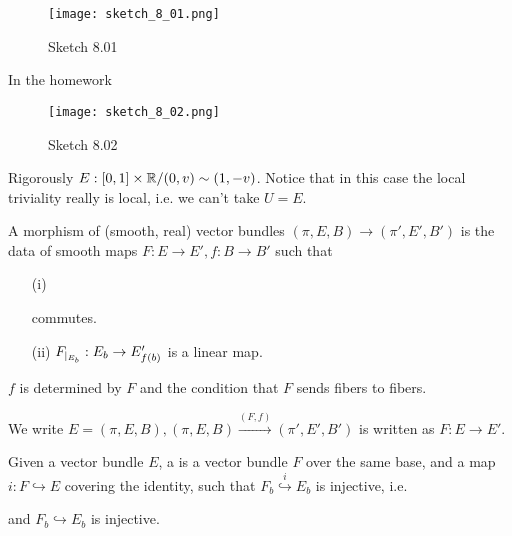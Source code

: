 \begin{figure}[H]\label{fig:8.1}
    \centering
    \texttt{[image: sketch\_8\_01.png]}
    \caption{Sketch 8.01}
\end{figure}
In the homework
\begin{figure}[H]\label{fig:8.2}
    \centering
    \texttt{[image: sketch\_8\_02.png]}
    \caption{Sketch 8.02}
\end{figure}
Rigorously \(E:[0,1]\times \mathbb{R}/(0,v)\sim(1,-v)\). Notice that in this case the local triviality really is local, i.e. we can't take \(U=E\).

\begin{definition*}
    A morphism of (smooth, real) vector bundles \((\pi,E,B)\to (\pi',E',B')\) is the data of smooth maps 
    \(F:E\to E',f:B\to B'\) such that 
    \begin{enumerate}
        \item[(i)]  commutes. 
        \item[(ii)] \(F_{|_{E_b}}:E_b\to E_{f(b)}'\) is a linear map.
    \end{enumerate}
\end{definition*}

\begin{remark} %
    \(f\) is determined by \(F\) and the condition that \(F\) sends fibers to fibers.
\end{remark}

 We write \(E=(\pi,E,B), (\pi,E,B)\stackrel{(F,f)}{\to} (\pi',E',B')\) is written as \(F:E\to E'\).

\begin{definition*}
    Given a vector bundle \(E\), a  is a vector bundle \(F\) over the same base,
    and a map \(i:F\hookrightarrow E\) covering the identity, such that \(F_b\stackrel{i}{\hookrightarrow}E_b\)
    is injective, i.e. 
    \begin{center}
    \end{center}
    and \(F_b\hookrightarrow E_b\) is injective.
\end{definition*}

